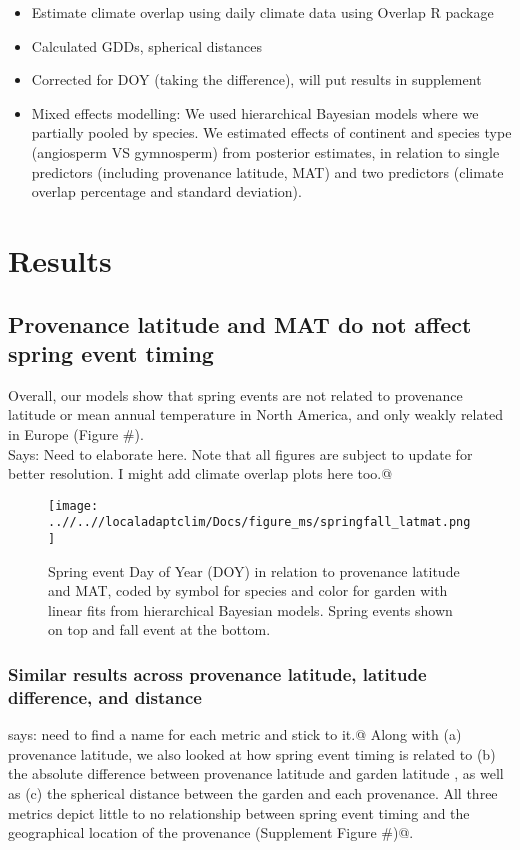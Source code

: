 \documentclass{article}
\begin{document}
\begin{itemize}
\begin{itemize}
\begin{itemize}
  \end{itemize}
  \end{itemize}
  \item Estimate climate overlap using daily climate data using Overlap R package
  \item Calculated GDDs, spherical distances
  \item Corrected for DOY (taking the difference), will put results in supplement
  \item Mixed effects modelling: We used hierarchical Bayesian models where we partially pooled by species. We estimated effects of continent and species type (angiosperm VS gymnosperm) from posterior estimates, in relation to single predictors (including provenance latitude, MAT) and two predictors (climate overlap percentage and standard deviation).
\end{itemize}

\section{Results}

\subsection{Provenance latitude and MAT do not affect spring event timing}

Overall, our models show that spring events are not related to provenance latitude or mean annual temperature in North America, and only weakly related in Europe (Figure \#). 
\\
\verb@Alina Says: Need to elaborate here. Note that all figures are subject to update for better resolution. I might add climate overlap plots here too.@

\begin{figure}[!h] 
    \centering
 \texttt{[image: ..//..//localadaptclim/Docs/figure\_ms/springfall\_latmat.png]}
    \caption{Spring event Day of Year (DOY) in relation to provenance latitude and MAT, coded by symbol for species and color for garden with linear fits from hierarchical Bayesian models. Spring events shown on top and fall event at the bottom.}
    \label{figure:springfall_latmat}
\end{figure}


\newpage

\subsubsection {Similar results across provenance latitude, latitude difference, and distance}
\verb@Alina says: need to find a name for each metric and stick to it.@
Along with (a) provenance latitude, we also looked at how spring event timing is related to (b) the absolute difference between provenance latitude and garden latitude , as well as (c) the spherical distance between the garden and each provenance. All three metrics depict little to no relationship between spring event timing and the geographical location of the provenance \verb@(Supplement Figure #)@.
\end{document}
